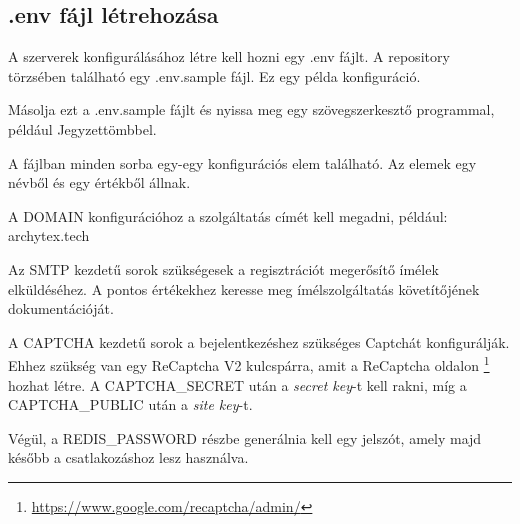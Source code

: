 \subsection{.env fájl létrehozása}
\label{config}

A szerverek konfigurálásához létre kell hozni egy .env fájlt. A repository törzsében található egy .env.sample fájl. Ez egy példa konfiguráció.

Másolja ezt a .env.sample fájlt és nyissa meg egy szövegszerkesztő programmal, például Jegyzettömbbel.

A fájlban minden sorba egy-egy konfigurációs elem található. Az elemek egy névből és egy értékből állnak.

A DOMAIN konfigurációhoz a szolgáltatás címét kell megadni, például: archytex.tech

Az SMTP kezdetű sorok szükségesek a regisztrációt megerősítő ímélek elküldéséhez. A pontos értékekhez keresse meg ímélszolgáltatás követítőjének dokumentációját.

A CAPTCHA kezdetű sorok a bejelentkezéshez szükséges Captchát konfigurálják. Ehhez szükség van egy ReCaptcha V2 kulcspárra, amit a ReCaptcha oldalon \footnote{\url{https://www.google.com/recaptcha/admin/}} hozhat létre. A CAPTCHA\_SECRET után a \emph{secret key}-t kell rakni, míg a CAPTCHA\_PUBLIC után a \emph{site key}-t.

Végül, a REDIS\_PASSWORD részbe generálnia kell egy jelszót, amely majd később a csatlakozáshoz lesz használva.